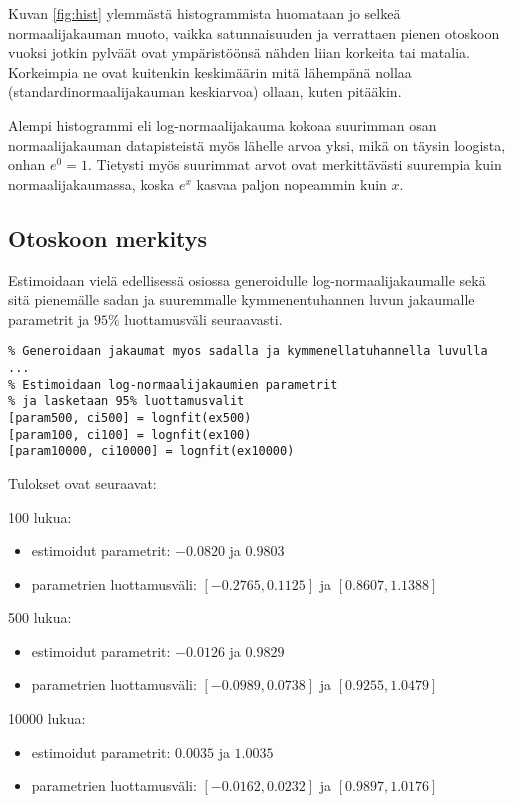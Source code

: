 \documentclass[a4paper,11pt]{article}
\begin{document}
{Kuvan \ref{fig:hist} ylemmästä histogrammista huomataan jo selkeä normaalijakauman muoto, vaikka satunnaisuuden ja verrattaen pienen otoskoon vuoksi jotkin pylväät ovat ympäristöönsä nähden liian korkeita tai matalia. Korkeimpia ne ovat kuitenkin keskimäärin mitä lähempänä nollaa (standardinormaalijakauman keskiarvoa) ollaan, kuten pitääkin.

Alempi histogrammi eli log-normaalijakauma kokoaa suurimman osan normaalijakauman datapisteistä myös lähelle arvoa yksi, mikä on täysin loogista, onhan $e^0=1$. Tietysti myös suurimmat arvot ovat merkittävästi suurempia kuin normaalijakaumassa, koska $e^x$ kasvaa paljon nopeammin kuin $x$.

\subsection{Otoskoon merkitys}

Estimoidaan vielä edellisessä osiossa generoidulle log-normaalijakaumalle sekä sitä pienemälle sadan ja suuremmalle kymmenentuhannen luvun jakaumalle parametrit ja $95\%$ luottamusväli seuraavasti.

\clearpage

\begin{lstlisting}
% Generoidaan jakaumat myos sadalla ja kymmenellatuhannella luvulla
...
% Estimoidaan log-normaalijakaumien parametrit
% ja lasketaan 95% luottamusvalit
[param500, ci500] = lognfit(ex500)
[param100, ci100] = lognfit(ex100)
[param10000, ci10000] = lognfit(ex10000)
\end{lstlisting}

Tulokset ovat seuraavat:

100 lukua:
\begin{itemize}
    \item estimoidut parametrit: $-0.0820$ ja $0.9803$
    \item parametrien luottamusväli: $[-0.2765, 0.1125]$ ja $[0.8607, 1.1388]$
\end{itemize}

500 lukua:
\begin{itemize}
    \item estimoidut parametrit: $-0.0126$ ja $0.9829$
    \item parametrien luottamusväli: $[-0.0989, 0.0738]$ ja $[0.9255, 1.0479]$
\end{itemize}

10000 lukua:
\begin{itemize}
    \item estimoidut parametrit: $0.0035$ ja $1.0035$
    \item parametrien luottamusväli: $[-0.0162, 0.0232]$ ja $[0.9897, 1.0176]$
\end{itemize}

}
\end{document}
